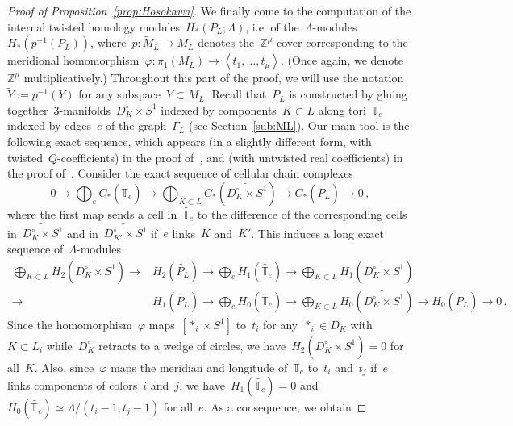 \documentclass{amsart}
\newcommand{\Z}{\mathbb{Z}}
\theoremstyle{definition}
\theoremstyle{remark}
\begin{document}
\begin{proof}[Proof of Proposition~\ref{prop:Hosokawa}]
	We finally come to the computation of the internal twisted homology modules~$H_*(P_L;\Lambda)$,
	i.e. of the~$\Lambda$-modules~$H_*(p^{-1}(P_L))$, where~$p\colon\widetilde{M}_L\to M_L$ denotes the~$\Z^\mu$-cover corresponding to the meridional homomorphism~$\varphi\colon\pi_1(M_L)\to\left<t_1,\dots,t_\mu\right>$. (Once again, we denote~$\Z^\mu$ multiplicatively.)
	Throughout this part of the proof, we will use the notation~$\widetilde{Y}:=p^{-1}(Y)$ for any subspace~$Y\subset M_L$.
	Recall that~$P_L$ is constructed by gluing together~3-manifolds~$D^\circ_K\times S^1$ indexed by components~$K\subset L$ along tori~$\mathbb{T}_e$ indexed by edges~$e$ of the graph~$\Gamma_L$ (see Section~\ref{sub:ML}).	
	Our main tool is the following exact sequence, which appears (in a slightly different form, with twisted~$Q$-coefficients) in the proof of~\cite[Lemma~3.3]{BFP16}, and (with untwisted real coefficients) in the proof of~\cite[Lemma~4.7]{CNT}.
Consider the exact sequence of cellular chain complexes
\[
0\longrightarrow\bigoplus_{e} C_*(\widetilde{\mathbb{T}_e})\longrightarrow\bigoplus_{K\subset L} C_*(\widetilde {D^\circ_K\times S^1})\longrightarrow C_*(\widetilde{P_L}
)\longrightarrow 0\,,
\]
where the first map sends a cell in~$\widetilde{\mathbb{T}_e}$ to the difference of the corresponding cells in~$\widetilde {D^\circ_K\times S^1}$ and in~$\widetilde {D^\circ_{K'}\times S^1}$ if~$e$ links~$K$ and~$K'$.
This induces a long exact sequence of~$\Lambda$-modules
\[
\begin{aligned}
\bigoplus_{K\subset L} H_2(\widetilde{D^\circ_K\times S^1})\longrightarrow &H_2(\widetilde{P_L})\longrightarrow\bigoplus_{e} H_1(\widetilde{\mathbb{T}_e})\longrightarrow\bigoplus_{K\subset L} H_1(\widetilde{D^\circ_K\times S^1})\\
\longrightarrow &H_1(\widetilde{P_L})
\longrightarrow\bigoplus_{e} H_0(\widetilde{\mathbb{T}_e})\longrightarrow\bigoplus_{K\subset L} H_0(\widetilde{D^\circ_K\times S^1})\longrightarrow H_0(\widetilde{P_L})\longrightarrow 0\,.
\end{aligned}
\]
Since the homomorphism~$\varphi$ maps~$[\ast_i\times S^1]$ to~$t_i$ for any~$\ast_i\in D_K$ with~$K\subset L_i$
while~$D^\circ_K$ retracts to a wedge of circles, we have~$H_2(\widetilde{D^\circ_K\times S^1})=0$ for all~$K$.
Also, since~$\varphi$ maps the meridian and longitude of~$\mathbb{T}_e$ to~$t_i$ and~$t_j$ if~$e$ links
components of colors~$i$ and~$j$, we have~$H_1(\widetilde{\mathbb{T}_e})=0$ and~$H_0(\widetilde{\mathbb{T}_e})\simeq\Lambda/(t_i-1,t_j-1)$ for all~$e$. As a consequence, we obtain

\end{proof}
\end{document}
